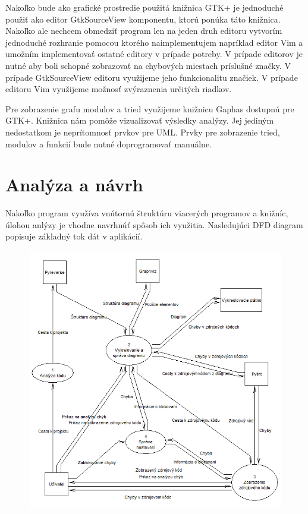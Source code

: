 \documentclass[11pt,oneside,final]{fithesis2}
\begin{document}
		Nakoľko bude ako grafické prostredie použitá knižnica GTK+ je jednoduché použiť ako editor GtkSourceView komponentu, ktorú ponúka táto knižnica. Nakoľko ale nechcem obmedziť program len na jeden druh editoru vytvorím jednoduché rozhranie pomocou ktorého naimplementujem napríklad editor Vim a umožním implementovať ostatné editory v prípade potreby. V prípade editorov je nutné aby boli schopné zobrazovať na chybových miestach príslušné značky. V prípade GtkSourceView editoru využijeme jeho funkcionalitu značiek. V prípade editoru Vim využijeme možnosť zvýraznenia určitých riadkov.
		
		Pre zobrazenie grafu modulov a tried využijeme knižnicu Gaphas dostupnú pre GTK+. Knižnica nám pomôže vizualizovať výsledky analýzy. Jej jediným nedostatkom je neprítomnosť prvkov pre UML. Prvky pre zobrazenie tried, modulov a funkcií bude nutné doprogramovať manuálne.


	\section{Analýza a návrh}
	
	Nakoľko program využíva vnútornú štruktúru viacerých programov a knižníc, úlohou anlýzy je vhodne navrhnúť spôsob ich využitia. Nasledujúci DFD diagram popisuje základný tok dát v aplikácií. 	
	
	\begin{figure}[htb]
	 \centering
	 \includegraphics[width=\textwidth]{images/dfd_main}
	\end{figure}
	
\end{document}
